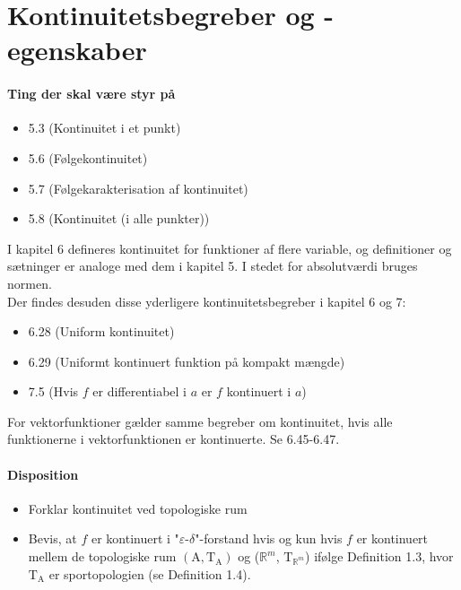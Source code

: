 \chapter{Kontinuitetsbegreber og -egenskaber}
\subsubsection{Ting der skal være styr på}
\begin{itemize}
\setlength\itemsep{0em}
\item 5.3 (Kontinuitet i et punkt)
\item 5.6 (Følgekontinuitet)
\item 5.7 (Følgekarakterisation af kontinuitet)
\item 5.8 (Kontinuitet (i alle punkter))
\end{itemize}
I kapitel 6 defineres kontinuitet for funktioner af flere variable, og definitioner og sætninger er analoge med dem i kapitel 5. I stedet for absolutværdi bruges normen.\\
Der findes desuden disse yderligere kontinuitetsbegreber i kapitel 6 og 7:
\begin{itemize}
\setlength\itemsep{0em}
\item 6.28 (Uniform kontinuitet)
\item 6.29 (Uniformt kontinuert funktion på kompakt mængde)
\item 7.5 (Hvis $f$ er differentiabel i $a$ er $f$ kontinuert i $a$)
\end{itemize}
For vektorfunktioner gælder samme begreber om kontinuitet, hvis alle funktionerne i vektorfunktionen er kontinuerte. Se 6.45-6.47.
\subsubsection{Disposition}
\begin{itemize}
\setlength\itemsep{0em}
\item Forklar kontinuitet ved topologiske rum
\item Bevis, at $f$ er kontinuert i "$\varepsilon$-$\delta$"-forstand hvis
og kun hvis $f$ er kontinuert mellem de topologiske rum $(\mathrm{A}, \mathrm{T}_\mathrm{A})$ og ($\mathbb{R}^m$, $\mathrm{T}_{\mathbb{R}^m}$)
ifølge Definition 1.3, hvor $\mathrm{T}_\mathrm{A}$ er sportopologien (se Definition 1.4).
\end{itemize}
%
\clearpage
